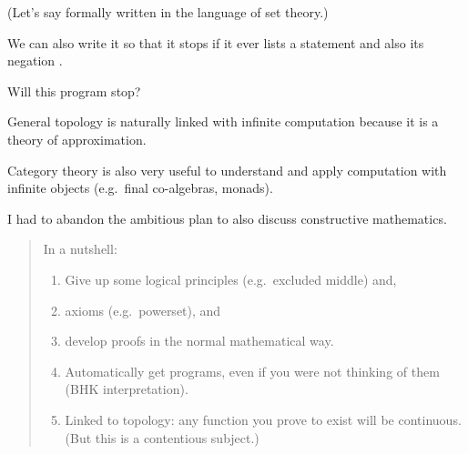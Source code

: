 \documentclass%
[%
Screen4to3,
]{foils}
\begin{document}
 (Let's say formally written in the language of set theory.)

\vfill

We can also write it so that it stops if it ever lists a statement  and also its negation . 

\vfill

Will this program stop? 

\vfill



 General topology is naturally linked with infinite computation because
it is a theory of approximation.

 Category theory is also very useful to understand and apply
computation with infinite objects (e.g.\ final co-algebras, monads).

 I had to abandon the ambitious plan to also discuss constructive
mathematics. 
\begin{quote}
In a nutshell: 
\begin{enumerate}
\item 
Give up some logical principles (e.g.\ excluded middle)
and, \item
 axioms (e.g.\ powerset), and \item
develop proofs in the normal
mathematical way. \item
Automatically get programs, even if you were not
thinking of them (BHK interpretation). 
\item Linked to topology: any
function you prove to exist will be continuous. \\ (But this is a contentious subject.)
\end{enumerate}
\end{quote}
\end{document}
